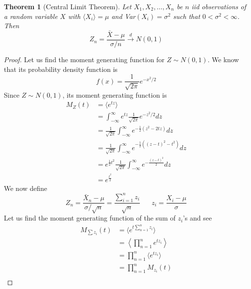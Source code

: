 \documentclass{article}
\newcommand{\twen}{\hspace{20pt}}
\newtheorem{theorem}{Theorem}[section]
\theoremstyle{definition}
\begin{document}
\begin{theorem}[Central Limit Theorem]
    Let $X_1,X_2,\ldots, X_n$ be $n$ iid observations of a random variable $X$ with $\langle X_i\rangle =\mu$ and Var$(X_i) =\sigma^2$ such that $0<\sigma^2<\infty$. Then 
    \begin{equation*}
        Z_n = \frac{\bar X-\mu}{\sigma/n} \overset{d}{\longrightarrow} N(0,1)
    \end{equation*}
\end{theorem}
\begin{proof}
    Let us find the moment generating function for $Z\sim N(0,1)$. We know that its probability density function is 
    \begin{equation*}
        f(x) = \frac{1}{\sqrt{2\pi}}e^{-x^2/2}
    \end{equation*}
    Since $Z\sim N(0,1)$, its moment generating function is 
    \begin{equation*}
        \begin{split}
            M_Z(t) &= \langle e^{tz}\rangle \\
            &= \int^\infty_{-\infty}e^{tz}\frac{1}{\sqrt{2\pi}}e^{-z^2/2}dz \\
            &= \frac{1}{\sqrt{2\pi}} \int^\infty_{-\infty} e^{-\frac{1}{2}(z^2-2tz)}dz \\
            &=\frac{1}{\sqrt{2\pi}} \int^\infty_{-\infty} e^{-\frac{1}{2}((z-t)^2-t^2)} dz \\
            &=e^{\frac{1}{2}t^2} \frac{1}{\sqrt{2\pi}}\int^\infty_{-\infty} e^{-\frac{(z-t)^2}{2}}dz\\
            &= e^{\frac{t^2}{2}}
        \end{split}
    \end{equation*}
    We now define 
    \begin{equation*}
        Z_n =\frac{\bar X_n - \mu}{\sigma/\sqrt{n}} = \frac{\sum^n_{i=1}z_i}{\sqrt{n}} \twen z_i = \frac{X_i -\mu}{\sigma}
    \end{equation*}
    Let us find the moment generating function of the sum of $z_i$'s and see 
    \begin{equation*}
        \begin{split}
            M_{\sum z_i}(t) &= \langle e^{t\sum ^n_{n=1}z_i}\rangle \\ &= \left\langle \prod^n_{n=1} e^{tz_i} \right\rangle \\
            &= \prod^n_{n=1} \langle e^{tz_i} \rangle \\
            &= \prod^n_{n=1} M_{z_i}(t) \\

\end{split}
\end{equation*}
\end{proof}
\end{document}
